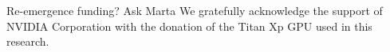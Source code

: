 \documentclass[essd, manuscript]{copernicus}
\begin{document}


\appendixfigures  %

\appendixtables   %







\begin{acknowledgements}
Re-emergence funding? Ask Marta
We gratefully acknowledge the support of NVIDIA Corporation with the donation of the Titan Xp GPU used in this research.
\end{acknowledgements}



\end{document}
